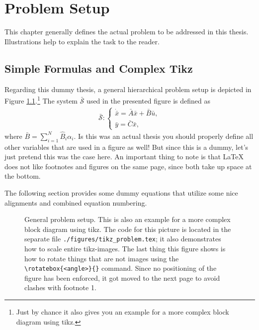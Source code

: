 \chapter{Problem Setup}
This chapter generally defines the actual problem to be addressed in this thesis. Illustrations help to explain the task to the reader.

\section{Simple Formulas and Complex Tikz}
Regarding this dummy thesis, a general hierarchical problem setup is depicted in Figure \ref{fig:problem}.\footnote{Just by chance it also gives you an example for a more complex block diagram using tikz.} The system $\bar{\mathcal{S}}$ used in the presented figure is defined as
\begin{align*}
\bar{\mathcal{S}}:
\begin{cases}
\dot{\bar{x}}=\bar{A}\bar{x}+\bar{B}\bar{u},\\
\bar{y}=\bar{C}\bar{x},
\end{cases}
\end{align*}
where $\bar{B}=\sum_{i=1}^{N}\hat{B}_{i}\alpha_{i}$. Is this was an actual thesis you should properly define all other variables that are used in a figure as well! But since this is a dummy, let's just pretend this was the case here. An important thing to note is that \LaTeX\; does not like footnotes and figures on the same page, since both take up space at the bottom.

The following section provides some dummy equations that utilize some nice alignments and combined equation numbering.

\begin{figure}
\centering
{}
\caption[Complex block diagrams in tikz]{General problem setup. This is also an example for a more complex block diagram using tikz. The code for this picture is located in the separate file \texttt{./figures/tikz\_problem.tex}; it also demonstrates how to scale entire tikz-images. The last thing this figure shows is how to rotate things that are not images using the \texttt{\textbackslash rotatebox\{<angle>\}\{<stuff to rotate>\}} command. Since no positioning of the figure has been enforced, it got moved to the next page to avoid clashes with footnote 1.}
\label{fig:problem}
\end{figure}

